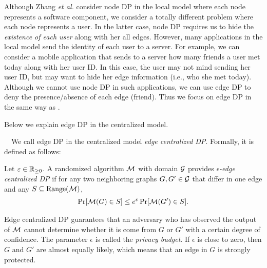 Although Zhang \textit{et al.} \cite{Zhang_USENIX20} consider node DP in the local model where each node represents a software component, we consider a totally different problem where each node represents a user. 
In the latter case, 
node DP requires us to hide the \textit{existence of each user} along with her all edges. 
However, many applications in the local model send the identity of each user to a server. 
For example, 
we can consider a mobile application 
that sends to a server how many friends a user met today along with her user ID. 
In this case, the user may not mind sending her user ID, 
but may want to hide her edge information (i.e., who she met today). 
Although we cannot use node DP in such applications, we can use edge DP to deny the presence/absence of each edge (friend). 
Thus we focus on edge DP in the same way as \cite{Qin_CCS17,Sun_CCS19,Ye_ICDE20,Ye_TKDE21}. 

Below we explain edge DP in the centralized model. 

\smallskip
{}~~We call edge DP in the centralized model \textit{edge centralized DP}. 
Formally, it is defined as follows:

\begin{definition}  \label{def:edge_CDP} 
Let $\varepsilon \in \mathbb{R}_{\ge0}$. 
A randomized algorithm $\mathcal{M}$ with domain $\mathcal{G}$ provides \emph{$\epsilon$-edge centralized DP} 
if for any two 
neighboring 
graphs $G, G' \in \mathcal{G}$ that differ in one edge and any $S \subseteq \mathrm{Range}(\mathcal{M})$, 
\begin{align}
\Pr[\mathcal{M}(G) \in S] \leq e^\varepsilon \Pr[\mathcal{M}(G') \in S].
\label{eq:edge_CDP}
\end{align}
\end{definition}
Edge centralized DP guarantees that an adversary who has observed the output of $\mathcal{M}$ cannot determine whether it is come from $G$ or $G'$ with a certain degree of confidence. 
The parameter $\epsilon$ is called the \textit{privacy budget}. 
If $\epsilon$ is close to zero, then $G$ and $G'$ are almost equally likely, which means that an edge in $G$ is strongly protected. 

